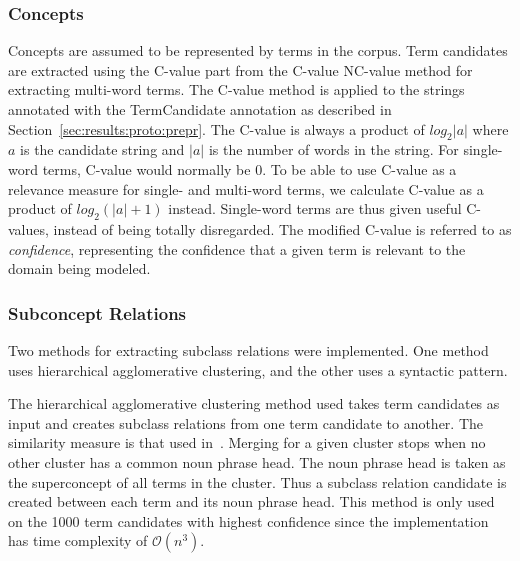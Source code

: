 \documentclass[a4paper]{report}
\begin{document}
\subsubsection{Concepts}

Concepts are assumed to be represented by terms in the corpus.
Term candidates are extracted using the C-value part from the C-value NC-value method for extracting multi-word terms.
The C-value method is applied to the strings annotated with the TermCandidate annotation as described in Section~\ref{sec:results:proto:prepr}.
The C-value is always a product of \(log_{2} |a|\) where \(a\) is the candidate string and \(|a|\) is the number of words in the string.
For single-word terms, C-value would normally be \(0\).
To be able to use C-value as a relevance measure for single- and multi-word terms, we calculate C-value as a product of \(log_{2} (|a|+1)\) instead.
Single-word terms are thus given useful C-values, instead of being totally disregarded.
The modified C-value is referred to as \emph{confidence}, representing the confidence that a given term is relevant to the domain being modeled.

\subsubsection{Subconcept Relations}

Two methods for extracting subclass relations were implemented.
One method uses hierarchical agglomerative clustering, and the other uses a syntactic pattern.

The hierarchical agglomerative clustering method used takes term candidates as input and creates subclass relations from one term candidate to another.
The similarity measure is that used in~\cite{Drymonas10OntoGain}.
Merging for a given cluster stops when no other cluster has a common noun phrase head.
The noun phrase head is taken as the superconcept of all terms in the cluster.
Thus a subclass relation candidate is created between each term and its noun phrase head.
This method is only used on the 1000 term candidates with highest confidence since the implementation has time complexity of \(\mathcal{O}(n^{3})\).
\end{document}
